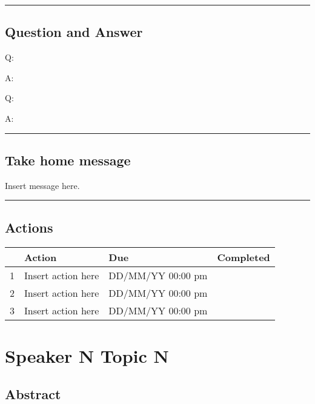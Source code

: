 \documentclass[
]{book}
\begin{document}
\begin{center}\rule{0.5\linewidth}{0.5pt}\end{center}

\hypertarget{question-and-answer-2}{%
\section*{Question and Answer}\label{question-and-answer-2}}

Q:

A:

Q:

A:

\begin{center}\rule{0.5\linewidth}{0.5pt}\end{center}

\hypertarget{take-home-message-2}{%
\section*{Take home message}\label{take-home-message-2}}

Insert message here.

\begin{center}\rule{0.5\linewidth}{0.5pt}\end{center}

\hypertarget{actions-2}{%
\section*{Actions}\label{actions-2}}

\begin{longtable}[]{@{}llll@{}}
\toprule
& Action & Due & Completed \\
\midrule
\endhead
1 & Insert action here & DD/MM/YY 00:00 pm & \\
2 & Insert action here & DD/MM/YY 00:00 pm & \\
3 & Insert action here & DD/MM/YY 00:00 pm & \\
\bottomrule
\end{longtable}

\hypertarget{speaker-n-topic-n-3}{%
\chapter{Speaker N Topic N}\label{speaker-n-topic-n-3}}

\hypertarget{abstract-3}{%
\section*{Abstract}\label{abstract-3}}
\end{document}
